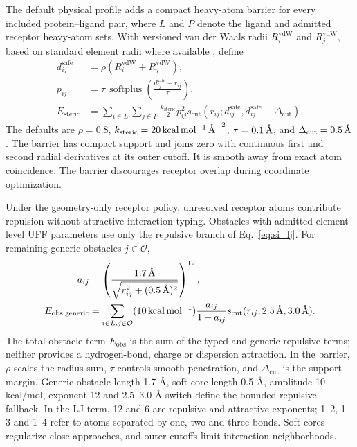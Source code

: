 \documentclass{article}
\newcommand{\angstrom}{\text{\normalfont\AA}}
\newcommand{\citep}[1]{\cite{#1}}
\begin{document}
The default physical profile adds a compact heavy-atom barrier for every included protein--ligand pair, where \(L\) and \(P\) denote the ligand and admitted receptor heavy-atom sets.
With versioned van der Waals radii \(R_i^{\mathrm{vdW}}\) and \(R_j^{\mathrm{vdW}}\), based on standard element radii where available \citep{bondi1964radii}, define
\begin{align}
    d_{ij}^{\mathrm{safe}}
    &=\rho\left(R_i^{\mathrm{vdW}}+R_j^{\mathrm{vdW}}\right),\\
    p_{ij}
    &=\tau\,\operatorname{softplus}
      \left(\frac{d_{ij}^{\mathrm{safe}}-r_{ij}}{\tau}\right),\\
    E_{\mathrm{steric}}
    &=\sum_{i\in L}\sum_{j\in P}
      \frac{k_{\mathrm{steric}}}{2}p_{ij}^{2}
      s_{\mathrm{cut}}\!\left(
        r_{ij};
        d_{ij}^{\mathrm{safe}},
        d_{ij}^{\mathrm{safe}}+\Delta_{\mathrm{cut}}
      \right).
    \label{eq:si_steric_barrier}
\end{align}
The defaults are \(\rho=0.8\), \(k_{\mathrm{steric}}=20\,\mathrm{kcal\,mol^{-1}\,\angstrom^{-2}}\), \(\tau=0.1\,\angstrom\), and \(\Delta_{\mathrm{cut}}=0.5\,\angstrom\).
The barrier has compact support and joins zero with continuous first and second radial derivatives at its outer cutoff. It is smooth away from exact atom coincidence.
The barrier discourages receptor overlap during coordinate optimization.

Under the geometry-only receptor policy, unresolved receptor atoms contribute repulsion without attractive interaction typing. Obstacles with admitted element-level UFF parameters use only the repulsive branch of Eq.~\eqref{eq:si_lj}. For remaining generic obstacles \(j\in\mathcal O\),
\begin{align}
 a_{ij}&=\left(\frac{1.7\,\angstrom}{\sqrt{r_{ij}^2+(0.5\,\angstrom)^2}}\right)^{12},\\
 E_{\mathrm{obs,generic}}&=\sum_{i\in L,j\in\mathcal O}
 (10\,\mathrm{kcal\,mol^{-1}})\frac{a_{ij}}{1+a_{ij}}
 s_{\mathrm{cut}}(r_{ij};2.5\,\angstrom,3.0\,\angstrom).
 \label{eq:si_generic_obstacles}
\end{align}
The total obstacle term \(E_{\mathrm{obs}}\) is the sum of the typed and generic repulsive terms; neither provides a hydrogen-bond, charge or dispersion attraction.
In the barrier, \(\rho\) scales the radius sum, \(\tau\) controls smooth penetration, and \(\Delta_{\mathrm{cut}}\) is the support margin. Generic-obstacle length 1.7 Å, soft-core length 0.5 Å, amplitude 10 kcal/mol, exponent 12 and 2.5--3.0 Å switch define the bounded repulsive fallback. In the LJ term, 12 and 6 are repulsive and attractive exponents; 1--2, 1--3 and 1--4 refer to atoms separated by one, two and three bonds. Soft cores regularize close approaches, and outer cutoffs limit interaction neighborhoods.
\end{document}
